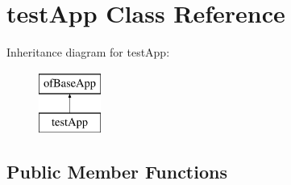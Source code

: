 \hypertarget{classtest_app}{\section{test\-App Class Reference}
\label{classtest_app}
}
Inheritance diagram for test\-App\-:\begin{figure}[H]
\begin{center}
\leavevmode
\includegraphics[height=2.000000cm]{classtest_app}
\end{center}
\end{figure}
\subsection*{Public Member Functions}
